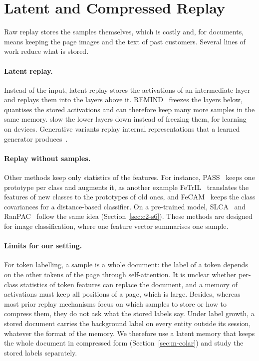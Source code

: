 \section{Latent and Compressed Replay}
\label{sec:c2-s5}

Raw replay stores the samples themselves, which is costly and, for documents, means keeping
the page images and the text of past customers. Several lines of work reduce what is
stored.

\paragraph{Latent replay.} Instead of the input, latent replay stores the activations of an
intermediate layer and replays them into the layers above it. REMIND~\citep{hayes2020remind}
freezes the layers below, quantises the stored activations and can therefore keep many more
samples in the same memory. \citet{pellegrini2020latent} slow the lower layers down instead
of freezing them, for learning on devices. Generative variants replay internal
representations that a learned generator produces~\citep{vandeven2020brain}.

\paragraph{Replay without samples.} Other methods keep only statistics of the features. For
instance, PASS~\citep{zhu2021pass} keeps one prototype per class and augments it, as another
example FeTrIL~\citep{petit2023fetril} translates the features of new classes to the
prototypes of old ones, and FeCAM~\citep{goswami2023fecam} keeps the class covariances for
a distance-based classifier. On a pre-trained model, SLCA~\citep{zhang2023slca} and
RanPAC~\citep{mcdonnell2023ranpac} follow the same idea (Section~\ref{sec:c2-s6}). These
methods are designed for image classification, where one feature vector summarises one
sample.

\paragraph{Limits for our setting.} For token labelling, a sample is a whole document: the
label of a token depends on the other tokens of the page through self-attention. It is
unclear whether per-class statistics of token features can replace the document, and a
memory of activations must keep all positions of a page, which is large. Besides, whereas
most prior replay mechanisms focus on which samples to store or how to compress them, they
do not ask what the stored labels say. Under label growth, a stored document carries the
background label on every entity outside its session, whatever the format of the memory. We
therefore use a latent memory that keeps the whole document in compressed form
(Section~\ref{sec:m-colar}) and study the stored labels separately.

